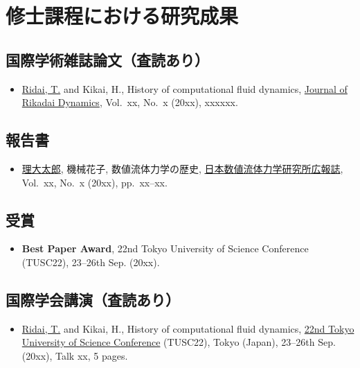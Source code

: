 \appendix
\label{ch:app}
\pagestyle{appendix}

\chapter{修士課程における研究成果}
\label{ch:app_master}

\section*{国際学術雑誌論文（査読あり）}
\label{sec:app_journal}
\begin{itemize}
    \item \underline{Ridai, T.} and Kikai, H., History of computational fluid dynamics, \href{https://doi.org/xxxxxx}{Journal of Rikadai Dynamics}, Vol.~xx, No.~x (20xx), xxxxxx.
\end{itemize}

\section*{報告書}
\label{sec:app_report}
\begin{itemize}
    \item \underline{理大太郎}, 機械花子, 数値流体力学の歴史, \href{https://xxxxxx}{日本数値流体力学研究所広報誌}, Vol.~xx, No.~x (20xx), pp.~xx--xx.
\end{itemize}

\section*{受賞}
\label{sec:app_award}
\begin{itemize}
    \item \textbf{Best Paper Award}, 22nd Tokyo University of Science Conference (TUSC22), 23--26th Sep. (20xx).
\end{itemize}

\section*{国際学会講演（査読あり）}
\label{sec:app_kokusai_review}
\begin{itemize}
    \item \underline{Ridai, T.} and Kikai, H., History of computational fluid dynamics, \href{https://xxxxxx}{22nd Tokyo University of Science Conference} (TUSC22), Tokyo (Japan), 23--26th Sep. (20xx), Talk xx, 5 pages.
\end{itemize}

